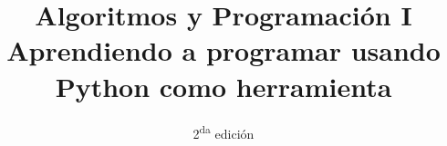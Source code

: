 \documentclass[11pt,spanish,a4paper,twoside,openany]{book}
\theoremstyle{definition}
\theoremstyle{definition}
\theoremstyle{remark}
\begin{document}
\title{{\bf Algoritmos y Programación I} \\ Aprendiendo a programar usando Python como herramienta}
\date{2\textsuperscript{da} edición}
\maketitle


\tableofcontents




















\begin{extract}

\end{extract}


\end{document}
